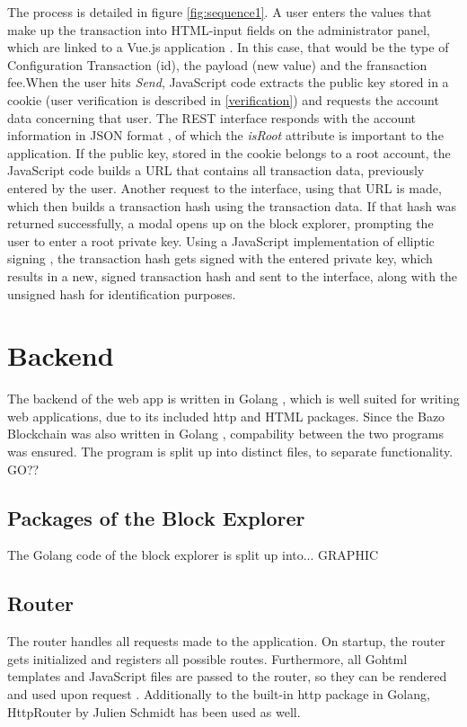 The process is detailed in figure \ref{fig:sequence1}. A user enters the values that make up the transaction into HTML-input fields on the administrator panel, which are linked to a Vue.js application \cite{vue} . In this case, that would be the type of Configuration Transaction (id), the payload (new value) and the fransaction fee.When the user hits \emph{Send}, JavaScript code extracts the public key stored in a cookie \cite{vcookies} (user verification is described in \ref{verification}) and requests the account data concerning that user. The REST interface responds with the account information in JSON format \cite{json} , of which the \emph{isRoot} attribute is important to the application. If the public key, stored in the cookie belongs to a root account, the JavaScript code builds a URL that contains all transaction data, previously entered by the user. Another request to the interface, using that URL is made, which then builds a transaction hash using the transaction data. If that hash was returned successfully, a modal opens up on the block explorer, prompting the user to enter a root private key. Using a JavaScript implementation of elliptic signing \cite{elliptic}, the transaction hash gets signed with the entered private key, which results in a new, signed transaction hash and sent to the interface, along with the unsigned hash for identification purposes.


\section{Backend}
The backend of the web app is written in Golang \cite{golang}, which is well suited for writing web applications, due to its included http \cite{httppackage}and HTML \cite{template} packages. Since the Bazo Blockchain was also written in Golang \cite{bazo}, compability between the two programs was ensured. The program is split up into distinct files, to separate functionality. GO??
\subsection{Packages of the Block Explorer}
The Golang code of the block explorer is split up into...
GRAPHIC
\subsection{Router}
The router handles all requests made to the application. On startup, the router gets initialized and registers all possible routes. Furthermore, all Gohtml templates and JavaScript files are passed to the router, so they can be rendered and used upon request \cite{httppackage}.
Additionally to the built-in http package in Golang, HttpRouter by Julien Schmidt \cite{httprouter} has been used as well. 

